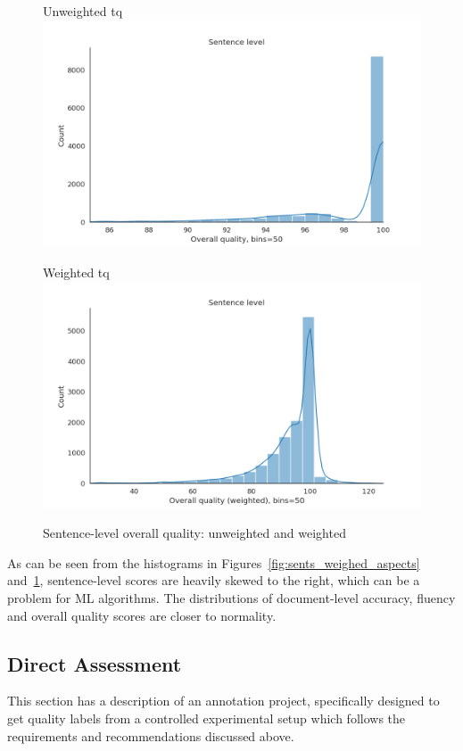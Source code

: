 \begin{figure}[H]
	\begin{minipage}[c]{0.5\linewidth}	
		\centering
		Unweighted tq
		\includegraphics[width=\textwidth]{figures/err/sent-tq-noweights}	
	\end{minipage}
	\begin{minipage}[c]{0.5\linewidth}
		\centering
		Weighted tq
		\includegraphics[width=\textwidth]{figures/err/sent-tq-major2critical5weighted}
	\end{minipage}
	\caption{\label{fig:sents_tq}Sentence-level overall quality: unweighted and weighted}
\end{figure}

As can be seen from the histograms in Figures~\ref{fig:sents_weighed_aspects} and~\ref{fig:sents_tq}, sentence-level scores are heavily skewed to the right, which can be a problem for ML algorithms. The distributions of document-level accuracy, fluency and overall quality scores are closer to normality.

\subsection{\label{ssec:da}Direct Assessment}
This section has a description of an annotation project, specifically designed to get quality labels from a controlled experimental setup which follows the requirements and recommendations discussed above.
 
